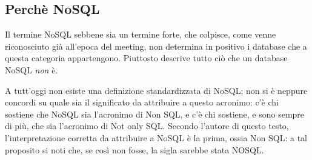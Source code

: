 \subsection{Perchè NoSQL}
Il termine NoSQL sebbene sia un termine forte, che colpisce, come venne riconosciuto già all'epoca del meeting, non determina in positivo i database che a questa categoria appartengono. Piuttosto descrive tutto ciò che un database NoSQL \emph{non} è.

A tutt'oggi non esiste una definizione standardizzata di NoSQL; non si è neppure concordi su quale sia il significato da attribuire a questo acronimo: c'è chi sostiene che NoSQL sia l'acronimo di Non SQL, e c'è chi sostiene, e sono sempre di più, che sia l'acronimo di Not only SQL.
Secondo l'autore di questo testo, l'interpretazione corretta da attribuire a NoSQL è la prima, ossia Non SQL: a tal proposito si noti che, se così non fosse, la sigla sarebbe stata NOSQL.


